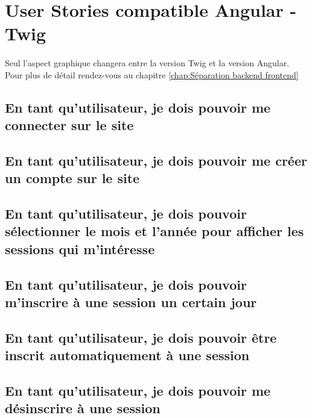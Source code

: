 \section{User Stories compatible Angular - Twig}
	\paragraph{}
		Seul l'aspect graphique changera entre la version Twig et la version Angular.
		Pour plus de détail rendez-vous au chapitre \ref{chap:Séparation backend frontend}
	
	\subsection{En tant qu’utilisateur, je dois pouvoir me connecter sur le site}
		
	
	\vspace{\baselineskip}
	\subsection{En tant qu’utilisateur, je dois pouvoir me créer un compte sur le site}
		

	\vspace{\baselineskip}
	\subsection{En tant qu'utilisateur, je dois pouvoir sélectionner le mois et l'année pour afficher les sessions qui m'intéresse}
		
	
	\vspace{\baselineskip}
	\subsection{En tant qu’utilisateur, je dois pouvoir m’inscrire à une session un certain jour}
		

	\vspace{\baselineskip}
	\subsection{En tant qu’utilisateur, je dois pouvoir être inscrit automatiquement à une session}
		
	
	\vspace{\baselineskip}
	\subsection{En tant qu’utilisateur, je dois pouvoir me désinscrire à une session}
		

